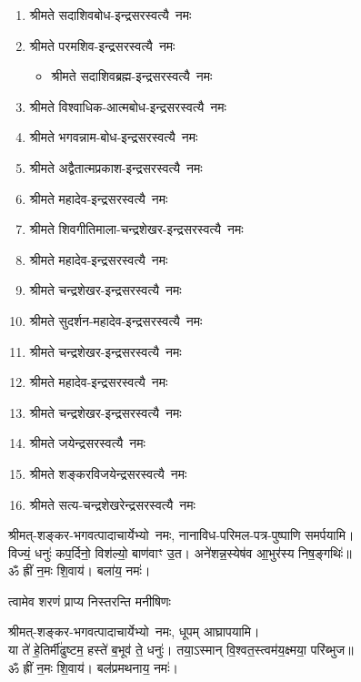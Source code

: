\begin{center}
\begin{flushleft}
\begin{enumerate}
\item श्रीमते सदाशिवबोध-इन्द्रसरस्वत्यै~नमः
\item श्रीमते परमशिव-इन्द्रसरस्वत्यै~नमः
\begin{itemize}%
\item श्रीमते सदाशिवब्रह्म-इन्द्रसरस्वत्यै~नमः
\end{itemize}
\item श्रीमते विश्वाधिक-आत्मबोध-इन्द्रसरस्वत्यै~नमः
\item श्रीमते भगवन्नाम-बोध-इन्द्रसरस्वत्यै~नमः
\item श्रीमते अद्वैतात्मप्रकाश-इन्द्रसरस्वत्यै~नमः
\item श्रीमते महादेव-इन्द्रसरस्वत्यै~नमः
\item श्रीमते शिवगीतिमाला-चन्द्रशेखर-इन्द्रसरस्वत्यै~नमः
\item श्रीमते महादेव-इन्द्रसरस्वत्यै~नमः
\item श्रीमते चन्द्रशेखर-इन्द्रसरस्वत्यै~नमः
\item श्रीमते सुदर्शन-महादेव-इन्द्रसरस्वत्यै~नमः
\item श्रीमते चन्द्रशेखर-इन्द्रसरस्वत्यै~नमः
\item श्रीमते महादेव-इन्द्रसरस्वत्यै~नमः
\item श्रीमते चन्द्रशेखर-इन्द्रसरस्वत्यै~नमः
\item श्रीमते जयेन्द्रसरस्वत्यै~नमः
\item श्रीमते शङ्करविजयेन्द्रसरस्वत्यै~नमः
\item श्रीमते सत्य-चन्द्रशेखरेन्द्रसरस्वत्यै~नमः
\end{enumerate}

    \end{flushleft}



श्रीमत्-शङ्कर-भगवत्पादाचार्येभ्यो~नमः, नानाविध-परिमल-पत्र-पुष्पाणि समर्पयामि।\\


विज्यं॒ धनुः॑ कप॒र्दिनो॒ विश॑ल्यो॒ बाण॑वाꣳ उ॒त। अने॑शन्न॒\-स्येष॑व आ॒भुर॑स्य निष॒ङ्गथिः॑॥\\
ॐ ह्रीं न॒मः शि॒वाय॑। बला॑य॒ नमः॑। 

{त्वामेव शरणं प्राप्य निस्तरन्ति मनीषिणः}

श्रीमत्-शङ्कर-भगवत्पादाचार्येभ्यो~नमः, धूपम् आघ्रापयामि।\\


या ते॑ हे॒तिर्मी॑ढुष्टम॒ हस्ते॑ ब॒भूव॑ ते॒ धनुः॑। तया॒ऽस्मान् वि॒श्वत॒स्त्वम॑य॒क्ष्मया॒ परि॑ब्भुज॥\\
ॐ ह्रीं न॒मः शि॒वाय॑। बल॑प्रमथनाय॒ नमः॑। 


\end{center}
